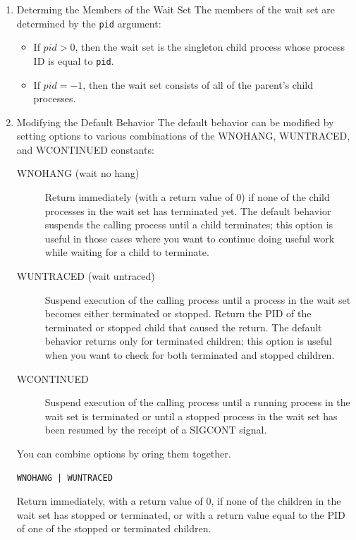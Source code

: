 \documentclass[11pt]{article}
\begin{document}
\begin{enumerate}
\item Determing the Members of the Wait Set
\label{sec:org4c96c53}
The members of the wait set are determined by the \texttt{pid} argument:\\
\begin{itemize}
\item If \(pid > 0\), then the wait set is the singleton child process whose process ID is equal to \texttt{pid}.\\
\item If \(pid = -1\), then the wait set consists of all of the parent's child processes.\\
\end{itemize}


\item Modifying the Default Behavior
\label{sec:org85e1d38}
The default behavior can be modified by setting options to various combinations of the WNOHANG, WUNTRACED, and WCONTINUED constants:\\
\begin{description}
\item[{WNOHANG (wait no hang)}] Return immediately (with a return value of 0) if none of the child processes in the wait set has terminated yet. The default behavior suspends the calling process until a child terminates; this option is useful in those cases where you want to continue doing useful work while waiting for a child to terminate.\\
\item[{WUNTRACED (wait untraced)}] Suspend execution of the calling process until a process in the wait set becomes either terminated or stopped. Return the PID of the terminated or stopped child that caused the return. The default behavior returns only for terminated children; this option is useful when you want to check for both terminated and stopped children.\\
\item[{WCONTINUED}] Suspend execution of the calling process until a running process in the wait set is terminated or until a stopped process in the wait set has been resumed by the receipt of a SIGCONT signal.\\
\end{description}


You can combine options by oring them together.\\
\begin{verbatim}
WNOHANG | WUNTRACED
\end{verbatim}
Return immediately, with a return value of 0, if none of the children in the wait set has stopped or terminated, or with a return value equal to the PID of one of the stopped or terminated children.\\




\end{enumerate}
\end{document}
